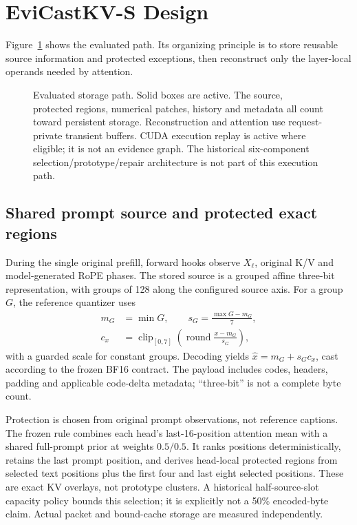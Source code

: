 \section{EviCastKV-S Design}
\label{sec:design}
Figure~\ref{fig:architecture} shows the evaluated path. Its organizing
principle is to store reusable source information and protected exceptions,
then reconstruct only the layer-local operands needed by attention.

\begin{figure}[t]
\centering

\caption{Evaluated storage path. Solid boxes are active. The source, protected
regions, numerical patches, history and metadata all count toward persistent
storage. Reconstruction and attention use request-private transient buffers.
CUDA execution replay is active where eligible; it is not an evidence graph.
The historical six-component selection/prototype/repair architecture is not
part of this execution path.}
\label{fig:architecture}
\end{figure}

\subsection{Shared prompt source and protected exact regions}
\label{sec:source}
During the single original prefill, forward hooks observe $X_\ell$, original
K/V and model-generated RoPE phases. The stored source is a grouped affine
three-bit representation, with groups of 128 along the configured source
axis. For a group $G$, the reference quantizer uses
\begin{equation}
\begin{aligned}
 m_G&=\min G,\qquad s_G=\frac{\max G-m_G}{7},\\
 c_x&=\operatorname{clip}_{[0,7]}
 \!\left(\operatorname{round}\frac{x-m_G}{s_G}\right),
\end{aligned}
 \label{eq:quant}
\end{equation}
with a guarded scale for constant groups. Decoding yields
$\widehat{x}=m_G+s_Gc_x$, cast according to the frozen BF16 contract.
The payload includes codes, headers, padding and applicable code-delta
metadata; ``three-bit'' is not a complete byte count.

Protection is chosen from original prompt observations, not reference
captions. The frozen rule combines each head's last-16-position attention
mean with a shared full-prompt prior at weights $0.5/0.5$. It ranks
positions deterministically, retains the last prompt position, and derives
head-local protected regions from selected text positions plus the first
four and last eight selected positions. These are exact KV overlays, not
prototype clusters. A historical half-source-slot capacity policy bounds
this selection; it is explicitly not a 50\% encoded-byte claim. Actual
packet and bound-cache storage are measured independently.

